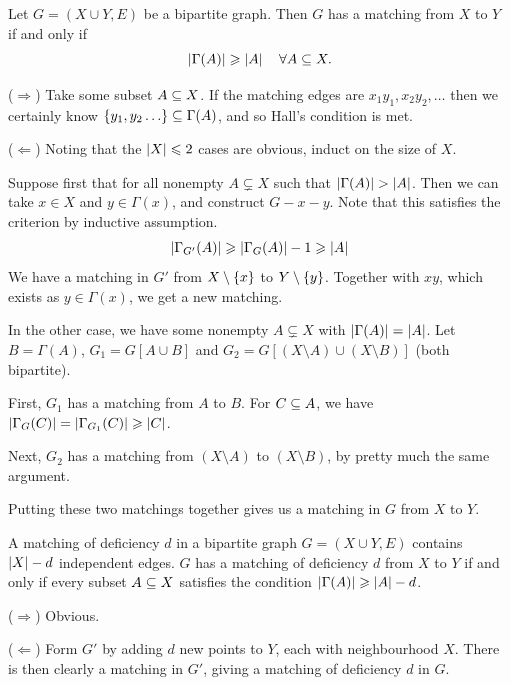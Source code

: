 \documentclass{article}
\begin{document}
\begin{theorem}
    \label{halls-marriage-theorem}
    Let $G = (X \cup Y, E)$ be a bipartite graph. Then $G$ has a matching from $X$ to $Y$ if and only if
    \[
	\left\lvert \Gamma(A) \right\rvert \geqslant \left\lvert A \right\rvert \quad \forall A \subseteq X.
	\]
\end{theorem}

\begin{prf}
    ($\Rightarrow$) Take some subset $A \subseteq X$. If the matching edges are $x_1y_1, x_2y_2, \dots$ then we certainly know $\set{y_1, y_2 \dots} \subs \Gamma(A)$, and so Hall's condition is met.
    
    ($\Leftarrow$) Noting that the $\left\lvert X \right\rvert \leqslant 2$ cases are obvious, induct on the size of $X$.
    
    Suppose first that for all nonempty $A \subsetneq X$ such that $\left\lvert \Gamma (A) \right\rvert > \left\lvert A \right\rvert$. Then we can take $x \in X$ and $y \in \Gamma (x)$, and construct $G - x - y$. Note that this satisfies the criterion by inductive assumption.
    \[
	\left\lvert \Gamma_{G'}(A) \right\rvert \geqslant \left\lvert \Gamma_G (A) \right\rvert - 1 \geqslant \left\lvert A \right\rvert
	\]
	We have a matching in $G'$ from $X \setminus \left\lbrace x \right\rbrace$ to $Y \setminus \left\lbrace y \right\rbrace$. Together with $xy$, which exists as $y \in \Gamma(x)$, we get a new matching.
	
	In the other case, we have some nonempty $A \subsetneq X$ with $\left\lvert \Gamma (A) \right\rvert = \left\lvert A \right\rvert$. Let $B = \Gamma(A)$, $G_1 = G[A \cup B]$ and $G_2 = G[(X \setminus A) \cup (X \setminus B)]$ (both bipartite).
	
	First, $G_1$ has a matching from $A$ to $B$. For $C \subseteq A$, we have $\left\lvert \Gamma_G (C) \right\rvert = \left\lvert \Gamma_{G_1} (C) \right\rvert\geqslant \left\lvert C \right\rvert$.

	Next, $G_2$ has a matching from $(X \setminus A)$ to $(X \setminus B)$, by pretty much the same argument.
	
	Putting these two matchings together gives us a matching in $G$ from $X$ to $Y$.
\end{prf}

\begin{corollary}
    A matching of deficiency $d$ in a bipartite graph $G = (X \cup Y, E)$ contains $\left\lvert X \right\rvert - d$ independent edges. $G$ has a matching of deficiency $d$ from $X$ to $Y$ if and only if every subset $A \subseteq X$ satisfies the condition $\left\lvert \Gamma(A) \right\rvert \geqslant \left\lvert A \right\rvert - d$.
\end{corollary}

\begin{prf}
    ($\Rightarrow$) Obvious.
    
    ($\Leftarrow$) Form $G'$ by adding $d$ new points to $Y$, each with neighbourhood $X$. There is then clearly a matching in $G'$, giving a matching of deficiency $d$ in $G$.
\end{prf}
\end{document}
